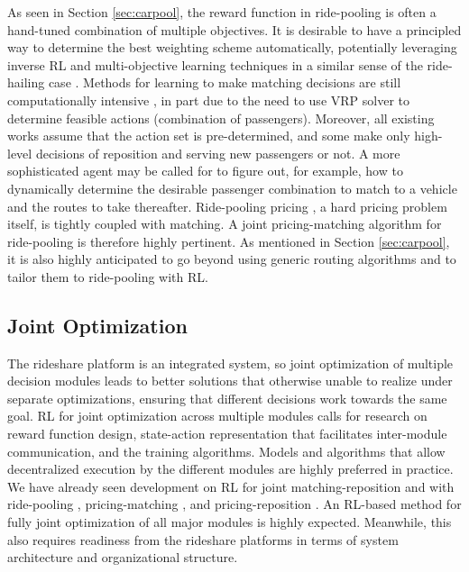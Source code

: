 \documentclass{article}
\begin{document}
As seen in Section \ref{sec:carpool}, the reward function in ride-pooling is often a hand-tuned combination of multiple objectives. It is desirable to have a principled way to determine the best weighting scheme automatically, potentially leveraging inverse RL and multi-objective learning techniques \citep{zou2021dynamic,arora2021survey} in a similar sense of the ride-hailing case \citep{zhou2021multi}.
Methods for learning to make matching decisions are still computationally intensive \citep{shah2020neural,yu2019integrated}, in part due to the need to use VRP solver to determine feasible actions (combination of passengers). Moreover, all existing works assume that the action set is pre-determined, and some make only high-level decisions of reposition and serving new passengers or not. A more sophisticated agent may be called for to figure out, for example, how to dynamically determine the desirable passenger combination to match to a vehicle and the routes to take thereafter. Ride-pooling pricing \citep{ke2020pricing}, a hard pricing problem itself, is tightly coupled with matching. A joint pricing-matching algorithm for ride-pooling is therefore highly pertinent. As mentioned in Section \ref{sec:carpool}, it is also highly anticipated to go beyond using generic routing algorithms and to tailor them to ride-pooling with RL.

\subsection{Joint Optimization}
The rideshare platform is an integrated system, so joint optimization of multiple decision modules leads to better solutions that otherwise unable to realize under separate optimizations, ensuring that different decisions work towards the same goal. RL for joint optimization across multiple modules calls for research on reward function design, state-action representation that facilitates inter-module communication, and the training algorithms. Models and algorithms that allow decentralized execution by the different modules are highly preferred in practice.
We have already seen development on RL for joint matching-reposition \citep{holler2019deep,jin2019coride,tang2021value} and with ride-pooling \citep{gueriau2018samod}, pricing-matching \citep{chen2019inbede}, and pricing-reposition \citep{turan2020dynamic}. An RL-based method for fully joint optimization of all major modules is highly expected. Meanwhile, this also requires readiness from the rideshare platforms in terms of system architecture and organizational structure.
\end{document}
